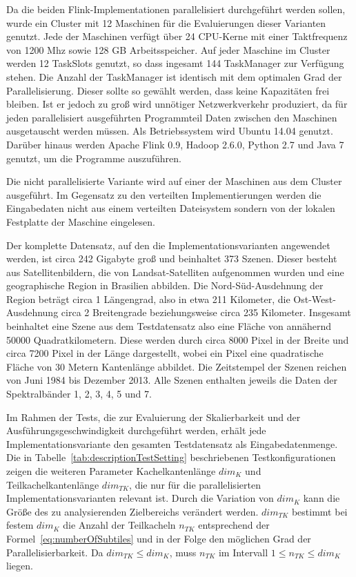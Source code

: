 Da die beiden Flink-Implementationen parallelisiert durchgeführt werden sollen, wurde ein Cluster mit 12 Maschinen für die Evaluierungen dieser Varianten genutzt. Jede der Maschinen verfügt über 24 CPU-Kerne mit einer Taktfrequenz von 1200 Mhz sowie 128 GB Arbeitsspeicher. Auf jeder Maschine im Cluster werden 12 TaskSlots genutzt, so dass ingesamt 144 TaskManager zur Verfügung stehen. Die Anzahl der TaskManager ist identisch mit dem optimalen Grad der Parallelisierung. Dieser sollte so gewählt werden, dass keine Kapazitäten frei bleiben. Ist er jedoch zu groß wird unnötiger Netzwerkverkehr produziert, da für jeden parallelisiert ausgeführten Programmteil Daten zwischen den Maschinen ausgetauscht werden müssen. Als Betriebssystem wird Ubuntu 14.04 genutzt. Darüber hinaus werden Apache Flink 0.9, Hadoop 2.6.0, Python 2.7 und Java 7 genutzt, um die Programme auszuführen.

Die nicht parallelisierte Variante wird auf einer der Maschinen aus dem Cluster ausgeführt. Im Gegensatz zu den verteilten Implementierungen werden die Eingabedaten nicht aus einem verteilten Dateisystem sondern von der lokalen Festplatte der Maschine eingelesen.

Der komplette Datensatz, auf den die Implementationsvarianten angewendet werden, ist circa 242 Gigabyte groß und beinhaltet 373 Szenen. Dieser besteht aus Satellitenbildern, die von Landsat-Satelliten aufgenommen wurden und eine geographische Region in Brasilien abbilden. Die Nord-Süd-Ausdehnung der Region beträgt circa 1 Längengrad, also in etwa 211 Kilometer, die Ost-West-Ausdehnung circa 2 Breitengrade beziehungsweise circa 235 Kilometer. Insgesamt beinhaltet eine Szene aus dem Testdatensatz also eine Fläche von annähernd 50000 Quadratkilometern. Diese werden durch circa 8000 Pixel in der Breite und circa 7200 Pixel in der Länge dargestellt, wobei ein Pixel eine quadratische Fläche von 30 Metern Kantenlänge abbildet. Die Zeitstempel der Szenen reichen von Juni 1984 bis Dezember 2013. Alle Szenen enthalten jeweils die Daten der Spektralbänder 1, 2, 3, 4, 5 und 7.

Im Rahmen der Tests, die zur Evaluierung der Skalierbarkeit und der Ausführungsgeschwindigkeit durchgeführt werden, erhält jede Implementationsvariante den gesamten Testdatensatz als Eingabedatenmenge. Die in Tabelle~\ref{tab:descriptionTestSetting} beschriebenen Testkonfigurationen zeigen die weiteren Parameter Kachelkantenlänge $dim_K$  und Teilkachelkantenlänge $dim_{TK}$, die nur für die parallelisierten Implementationsvarianten relevant ist. Durch die Variation von $dim_K$ kann die Größe des zu analysierenden Zielbereichs verändert werden. $dim_{TK}$ bestimmt bei festem $dim_K$ die Anzahl der Teilkacheln $n_{TK}$ entsprechend der Formel~\ref{eq:numberOfSubtiles} und in der Folge den möglichen Grad der Parallelisierbarkeit. Da $dim_{TK} \leq dim_K$, muss $n_{TK}$ im Intervall $1 \leq n_{TK} \leq dim_K$ liegen. 

